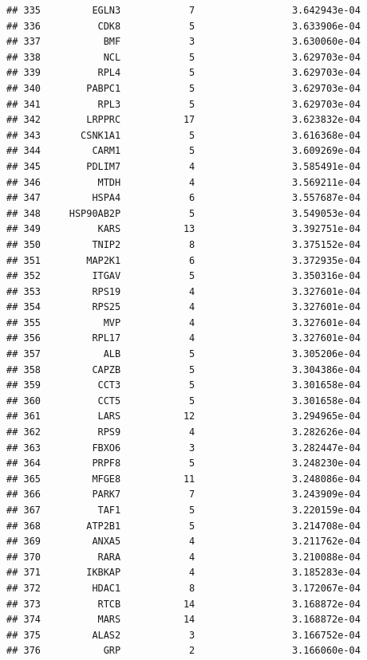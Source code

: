\documentclass[
]{article}
\begin{document}
\begin{verbatim}
## 335         EGLN3            7                 3.642943e-04
## 336          CDK8            5                 3.633906e-04
## 337           BMF            3                 3.630060e-04
## 338           NCL            5                 3.629703e-04
## 339          RPL4            5                 3.629703e-04
## 340        PABPC1            5                 3.629703e-04
## 341          RPL3            5                 3.629703e-04
## 342        LRPPRC           17                 3.623832e-04
## 343       CSNK1A1            5                 3.616368e-04
## 344         CARM1            5                 3.609269e-04
## 345        PDLIM7            4                 3.585491e-04
## 346          MTDH            4                 3.569211e-04
## 347         HSPA4            6                 3.557687e-04
## 348     HSP90AB2P            5                 3.549053e-04
## 349          KARS           13                 3.392751e-04
## 350         TNIP2            8                 3.375152e-04
## 351        MAP2K1            6                 3.372935e-04
## 352         ITGAV            5                 3.350316e-04
## 353         RPS19            4                 3.327601e-04
## 354         RPS25            4                 3.327601e-04
## 355           MVP            4                 3.327601e-04
## 356         RPL17            4                 3.327601e-04
## 357           ALB            5                 3.305206e-04
## 358         CAPZB            5                 3.304386e-04
## 359          CCT3            5                 3.301658e-04
## 360          CCT5            5                 3.301658e-04
## 361          LARS           12                 3.294965e-04
## 362          RPS9            4                 3.282626e-04
## 363         FBXO6            3                 3.282447e-04
## 364         PRPF8            5                 3.248230e-04
## 365         MFGE8           11                 3.248086e-04
## 366         PARK7            7                 3.243909e-04
## 367          TAF1            5                 3.220159e-04
## 368        ATP2B1            5                 3.214708e-04
## 369         ANXA5            4                 3.211762e-04
## 370          RARA            4                 3.210088e-04
## 371        IKBKAP            4                 3.185283e-04
## 372         HDAC1            8                 3.172067e-04
## 373          RTCB           14                 3.168872e-04
## 374          MARS           14                 3.168872e-04
## 375         ALAS2            3                 3.166752e-04
## 376           GRP            2                 3.166060e-04

\end{verbatim}
\end{document}
